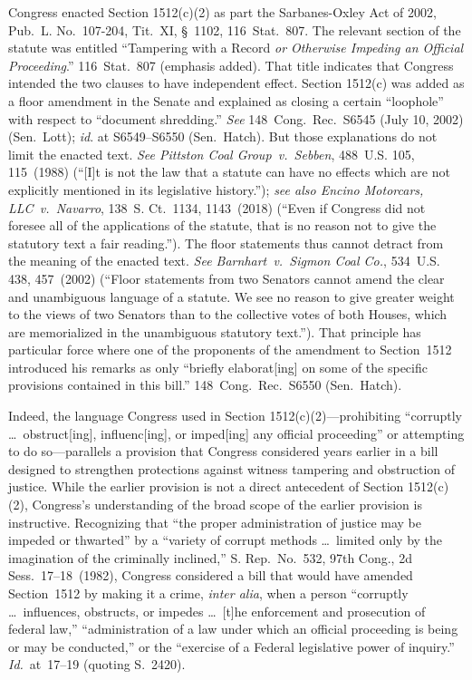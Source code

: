 Congress enacted Section 1512(c)(2) as part the Sarbanes-Oxley Act of 2002, Pub.\ L. No.~107-204, Tit.~XI, \S~1102, 116~Stat.~807.
The relevant section of the statute was entitled ``Tampering with a Record \textit{or Otherwise Impeding an Official Proceeding}.''
116~Stat.~807 (emphasis added).
That title indicates that Congress intended the two clauses to have independent effect.
Section 1512(c) was added as a floor amendment in the Senate and explained as closing a certain ``loophole'' with respect to ``document shredding.''
\textit{See} 148~Cong.\ Rec.\ S6545 (July 10, 2002) (Sen.~Lott);
\textit{id}. at S6549--S6550 (Sen.~Hatch).
But those explanations do not limit the enacted text.
\textit{See Pittston Coal Group~v.\ Sebben}, 488~U.S. 105, 115~(1988) (``[I]t is not the law that a statute can have no effects which are not explicitly mentioned in its legislative history.'');
\textit{see also Encino Motorcars, LLC~v.\ Navarro}, 138~S. Ct.~1134, 1143~(2018) (``Even if Congress did not foresee all of the applications of the statute, that is no reason not to give the statutory text a fair reading.'').
The floor statements thus cannot detract from the meaning of the enacted text.
\textit{See Barnhart~v.\ Sigmon Coal Co.}, 534~U.S. 438, 457~(2002) (``Floor statements from two Senators cannot amend the clear and unambiguous language of a statute.
We see no reason to give greater weight to the views of two Senators than to the collective votes of both Houses, which are memorialized in the unambiguous statutory text.'').
That principle has particular force where one of the proponents of the amendment to Section~1512 introduced his remarks as only ``briefly elaborat[ing] on some of the specific provisions contained in this bill.''
148~Cong.\ Rec.\ S6550 (Sen.~Hatch).

Indeed, the language Congress used in Section 1512(c)(2)---prohibiting ``corruptly \dots\ obstruct[ing], influenc[ing], or imped[ing] any official proceeding'' or attempting to do so---parallels a provision that Congress considered years earlier in a bill designed to strengthen protections against witness tampering and obstruction of justice.
While the earlier provision is not a direct antecedent of Section 1512(c)(2), Congress's understanding of the broad scope of the earlier provision is instructive.
Recognizing that ``the proper administration of justice may be impeded or thwarted'' by a ``variety of corrupt methods \dots\ limited only by the imagination of the criminally inclined,'' S. Rep.\ No.~532, 97th Cong., 2d Sess.~17--18~(1982), Congress considered a bill that would have amended Section~1512 by making it a crime, \textit{inter alia}, when a person ``corruptly \dots\ influences, obstructs, or impedes \dots\ [t]he enforcement and prosecution of federal law,'' ``administration of a law under which an official proceeding is being or may be conducted,'' or the ``exercise of a Federal legislative power of inquiry.'' \textit{Id.}~at~17--19 (quoting S.~2420).

